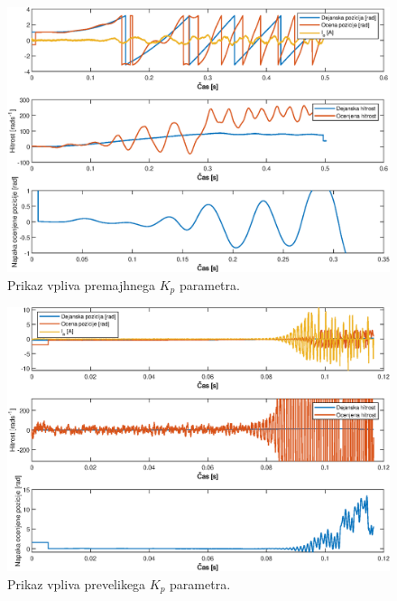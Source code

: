 \documentclass[a4paper,twoside,openright,12pt,slovene]{book}
\begin{document}
\begin{figure}[!htbp]
    \centering
    \includegraphics[width=1\columnwidth]{Slike/PItuning_Kp_unstableLow.eps}
    \caption{\label{PItuning_Kp_unstableLow} Prikaz vpliva premajhnega $K_p$ parametra. }
\end{figure}

\begin{figure}[!htbp]
    \centering
    \includegraphics[width=1\columnwidth]{Slike/PItuning_Kp_unstableHigh.eps}
    \caption{\label{PItuning_Kp_unstableHigh} Prikaz vpliva prevelikega $K_p$ parametra. }
\end{figure}
\end{document}
